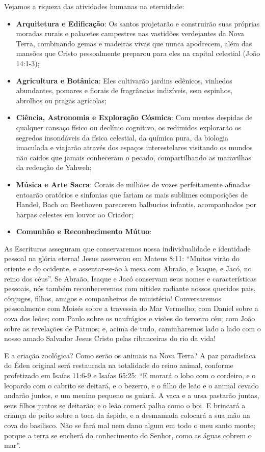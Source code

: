 Vejamos a riqueza das atividades humanas na eternidade:
\begin{itemize}
  \item \textbf{Arquitetura e Edificação}: Os santos projetarão e construirão suas próprias moradas rurais e palacetes campestres nas vastidões verdejantes da Nova Terra, combinando gemas e madeiras vivas que nunca apodrecem, além das mansões que Cristo pessoalmente preparou para eles na capital celestial (João 14:1-3);
  \item \textbf{Agricultura e Botânica}: Eles cultivarão jardins edênicos, vinhedos abundantes, pomares e florais de fragrâncias indizíveis, sem espinhos, abrolhos ou pragas agrícolas;
  \item \textbf{Ciência, Astronomia e Exploração Cósmica}: Com mentes despidas de qualquer cansaço físico ou declínio cognitivo, os redimidos explorarão os segredos insondáveis da física celestial, da química pura, da biologia imaculada e viajarão através dos espaços interestelares visitando os mundos não caídos que jamais conheceram o pecado, compartilhando as maravilhas da redenção de Yahweh;
  \item \textbf{Música e Arte Sacra}: Corais de milhões de vozes perfeitamente afinadas entoarão oratórios e sinfonias que fariam as mais sublimes composições de Handel, Bach ou Beethoven parecerem balbucios infantis, acompanhados por harpas celestes em louvor ao Criador;
  \item \textbf{Comunhão e Reconhecimento Mútuo}:
\end{itemize}

As Escrituras asseguram que conservaremos nossa individualidade e identidade pessoal na glória eterna! Jesus asseverou em Mateus 8:11: ``Muitos virão do oriente e do ocidente, e assentar-se-ão à mesa com Abraão, e Isaque, e Jacó, no reino dos céus''. Se Abraão, Isaque e Jacó conservam seus nomes e características pessoais, nós também reconheceremos com nitidez radiante nossos queridos pais, cônjuges, filhos, amigos e companheiros de ministério! Conversaremos pessoalmente com Moisés sobre a travessia do Mar Vermelho; com Daniel sobre a cova dos leões; com Paulo sobre os naufrágios e visões do terceiro céu; com João sobre as revelações de Patmos; e, acima de tudo, caminharemos lado a lado com o nosso amado Salvador Jesus Cristo pelas ribanceiras do rio da vida!

E a criação zoológica? Como serão os animais na Nova Terra?
A paz paradisíaca do Éden original será restaurada na totalidade do reino animal, conforme profetizado em Isaías 11:6-9 e Isaías 65:25:
``E morará o lobo com o cordeiro, e o leopardo com o cabrito se deitará, e o bezerro, e o filho de leão e o animal cevado andarão juntos, e um menino pequeno os guiará. A vaca e a ursa pastarão juntas, seus filhos juntos se deitarão; e o leão comerá palha como o boi. E brincará a criança de peito sobre a toca da áspide, e a desmamada colocará a sua mão na cova do basilisco. Não se fará mal nem dano algum em todo o meu santo monte; porque a terra se encherá do conhecimento do Senhor, como as águas cobrem o mar''.

